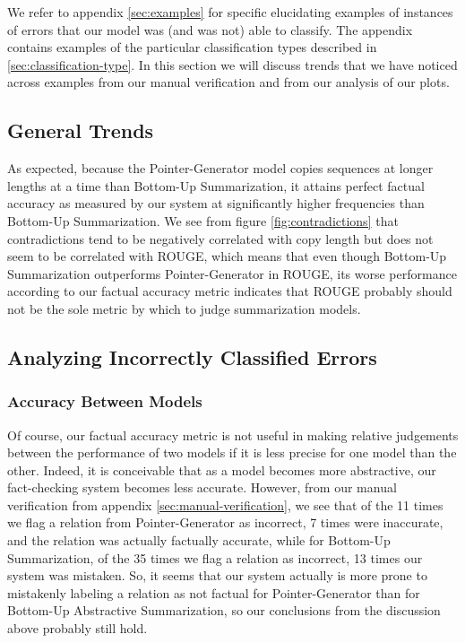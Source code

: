 \documentclass{article}
\begin{document}
We refer to appendix \ref{sec:examples} for specific elucidating examples of instances of errors that our model was (and was not) able to classify. The appendix contains examples of the particular classification types described in \ref{sec:classification-type}. In this section we will discuss trends that we have noticed across examples from our manual verification and from our analysis of our plots.

\subsection{General Trends}

As expected, because the Pointer-Generator model copies sequences at longer lengths at a time than Bottom-Up Summarization, it attains perfect factual accuracy as measured by our system at significantly higher frequencies than Bottom-Up Summarization. We see from figure \ref{fig:contradictions} that contradictions tend to be negatively correlated with copy length but does not seem to be correlated with ROUGE, which means that even though Bottom-Up Summarization outperforms Pointer-Generator in ROUGE, its worse performance according to our factual accuracy metric indicates that ROUGE probably should not be the sole metric by which to judge summarization models.

\subsection{Analyzing Incorrectly Classified Errors}

\subsubsection{Accuracy Between Models}

Of course, our factual accuracy metric is not useful in making relative judgements between the performance of two models if it is less precise for one model than the other. Indeed, it is conceivable that as a model becomes more abstractive, our fact-checking system becomes less accurate. However, from our manual verification from appendix \ref{sec:manual-verification}, we see that of the 11 times we flag a relation from Pointer-Generator as incorrect, 7 times were inaccurate, and the relation was actually factually accurate, while for Bottom-Up Summarization, of the 35 times we flag a relation as incorrect, 13 times our system was mistaken. So, it seems that our system actually is more prone to mistakenly labeling a relation as not factual for Pointer-Generator than for Bottom-Up Abstractive Summarization, so our conclusions from the discussion above probably still hold.
\end{document}
